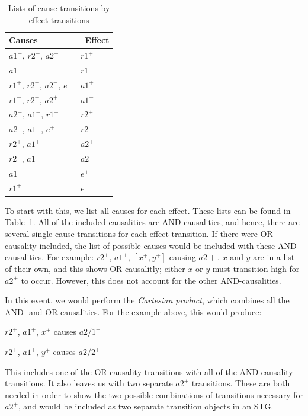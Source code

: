 \documentclass[british,conference,compsoc]{IEEEtran}
\begin{document}
\begin{table}[t]
\caption{Lists of cause transitions by effect transitions
		\label{tab:list-of-concepts}}
  \centering
\begin{tabular}[htb]{| m{2.7cm} | m{2.0cm} |}
  \hline
Causes & \, Effect \\ \hline \hline
$a1^{-}$, $r2^{-}$, $a2^{-}$ 			& $r1^{+}$ 	\\ \hline
$a1^{+}$ 						& $r1^{-}$ 	\\ \hline
$r1^{+}$, $r2^{-}$, $a2^{-}$, $e^{-}$ 	& $a1^{+}$ 	\\ \hline
$r1^{-}$, $r2^{+}$, $a2^{+}$ 			& $a1^{-}$ 	\\ \hline
$a2^{-}$, $a1^{+}$, $r1^{-}$ 			& $r2^{+}$ 	\\ \hline
$a2^{+}$, $a1^{-}$, $e^{+}$ 			& $r2^{-}$ 	\\ \hline
$r2^{+}$, $a1^{+}$ 				& $a2^{+}$ 	\\ \hline
$r2^{-}$, $a1^{-}$ 				& $a2^{-}$ 	\\ \hline
$a1^{-}$ 						& $e^{+}$ 	\\ \hline
$r1^{+}$ 						& $e^{-}$	\\ \hline

  \end{tabular}
  \vspace{-3mm}
\end{table}

To start with this, we list all causes for each effect. These lists can be found in
Table~\ref{tab:list-of-concepts}.
All of the included causalities are AND-causalities, and hence, there
are several single cause transitions for each effect transition. If there were 
OR-causality included, the list of possible causes would be included with these
AND-causalities. For example:  $r2^{+}$, $a1^{+}$, $[x^{+}, y^{+}]$ causing
$a2{+}$. $x$ and $y$ are in a list of their own, and this shows OR-causalitly;
either $x$ or $y$ must transition high for $a2^{+}$ to occur. However, this does
not account for the other AND-causalities. 

In this event, we would perform the \emph{Cartesian product}, which combines
all the AND- and OR-causalities. For the example above, this would produce:

$r2^{+}$, $a1^{+}$, $x^{+}$ causes $a2/1^{+}$

$r2^{+}$, $a1^{+}$, $y^{+}$ causes $a2/2^{+}$

\noindent This includes one of the OR-causality transitions with all of the 
AND-causality transitions. It also leaves us with two separate $a2^{+}$ 
transitions. These are both needed in order to show the two possible 
combinations of transitions necessary for $a2^{+}$, and would be included as two
separate transition objects in an STG. 
\end{document}
